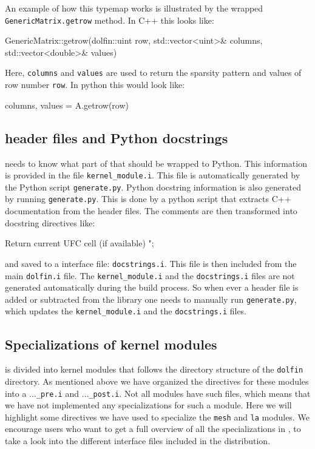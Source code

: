 An example of how this typemap works is illustrated by the wrapped \texttt{GenericMatrix.getrow} method. In C++ this looks like:
\begin{c++}
GenericMatrix::getrow(dolfin::uint row, std::vector<uint>& columns, std::vector<double>& values)
\end{c++}
Here, \texttt{columns} and \texttt{values} are used to return the sparsity pattern and values of row number \texttt{row}. In python this would look like:
\begin{python}
columns, values = A.getrow(row)
\end{python}

\subsection{\dolfin header files and Python docstrings}
\swig needs to know what part of \dolfin that should be wrapped to Python. This information is provided in the file \texttt{kernel\_module.i}. This file is automatically generated by the Python script \texttt{generate.py}. Python docstring information is also generated by running \texttt{generate.py}. This is done by a python script that extracts C++ documentation from the header files. The comments are then transformed into \swig docstring directives like:
\begin{c++}
Return current UFC cell (if available)
";
\end{c++}
and saved to a \swig interface file: \texttt{docstrings.i}. This file is then included from the main \texttt{dolfin.i} file. The \texttt{kernel\_module.i} and the \texttt{docstrings.i} files are not generated automatically during the build process. So when ever a header file is added or subtracted from the \dolfin library one needs to manually run \texttt{generate.py}, which updates the \texttt{kernel\_module.i} and the \texttt{docstrings.i} files.\par

\subsection{Specializations of kernel modules}
\dolfin is divided into kernel modules that follows the directory structure of the \texttt{dolfin} directory. As mentioned above we have organized the \swig directives for these modules into a \texttt{$\ldots$\_pre.i} and \texttt{$\ldots$\_post.i}. Not all modules have such files, which means that we have not implemented any specializations for such a module. Here we will highlight some \swig directives we have used to specialize the \texttt{mesh} and \texttt{la} modules. We encourage users who want to get a full overview of all the specializations in \pydolfin, to take a look into the different \swig interface files included in the distribution.\par

